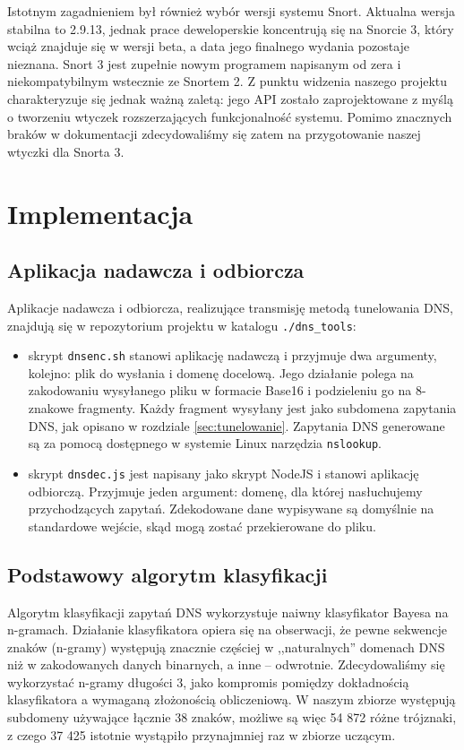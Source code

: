 \documentclass{eiti-raport}
\begin{document}
Istotnym zagadnieniem był również wybór wersji systemu Snort. Aktualna wersja stabilna to 2.9.13, jednak prace deweloperskie koncentrują się na Snorcie 3, który wciąż znajduje się w wersji beta, a data jego finalnego wydania pozostaje nieznana. Snort 3 jest zupełnie nowym programem napisanym od zera i niekompatybilnym wstecznie ze Snortem 2. Z punktu widzenia naszego projektu charakteryzuje się jednak ważną zaletą: jego API zostało zaprojektowane z myślą o tworzeniu wtyczek rozszerzających funkcjonalność systemu. Pomimo znacznych braków w dokumentacji zdecydowaliśmy się zatem na przygotowanie naszej wtyczki dla Snorta 3. 

\section{Implementacja} \label{sec:implementation}

\subsection{Aplikacja nadawcza i odbiorcza} \label{sec:implementacja-dnstools}
Aplikacje nadawcza i odbiorcza, realizujące transmisję metodą tunelowania DNS, znajdują się w repozytorium projektu w katalogu \texttt{./dns\_tools}:
\begin{itemize}
	\item skrypt \texttt{dnsenc.sh} stanowi aplikację nadawczą i przyjmuje dwa argumenty, kolejno: plik do wysłania i domenę docelową. Jego działanie polega na zakodowaniu wysyłanego pliku w formacie Base16 i podzieleniu go na 8-znakowe fragmenty. Każdy fragment wysyłany jest jako subdomena zapytania DNS, jak opisano w rozdziale \ref{sec:tunelowanie}. Zapytania DNS generowane są za pomocą dostępnego w systemie Linux narzędzia \texttt{nslookup}. 
	\item skrypt \texttt{dnsdec.js} jest napisany jako skrypt NodeJS i stanowi aplikację odbiorczą. Przyjmuje jeden argument: domenę, dla której nasłuchujemy przychodzących zapytań. Zdekodowane dane wypisywane są domyślnie na standardowe wejście, skąd mogą zostać przekierowane do pliku. 
\end{itemize}

\subsection{Podstawowy algorytm klasyfikacji} \label{sec:implementacja-bayes}
Algorytm klasyfikacji zapytań DNS wykorzystuje naiwny klasyfikator Bayesa na n-gramach. Działanie klasyfikatora opiera się na obserwacji, że pewne sekwencje znaków (n-gramy) występują znacznie częściej w ,,naturalnych'' domenach DNS niż w zakodowanych danych binarnych, a inne -- odwrotnie. Zdecydowaliśmy się wykorzystać n-gramy długości 3, jako kompromis pomiędzy dokładnością klasyfikatora a wymaganą złożonością obliczeniową. W naszym zbiorze występują subdomeny używające łącznie 38 znaków, możliwe są więc 54 872 różne trójznaki, z czego 37 425 istotnie wystąpiło przynajmniej raz w zbiorze uczącym. 
\end{document}
